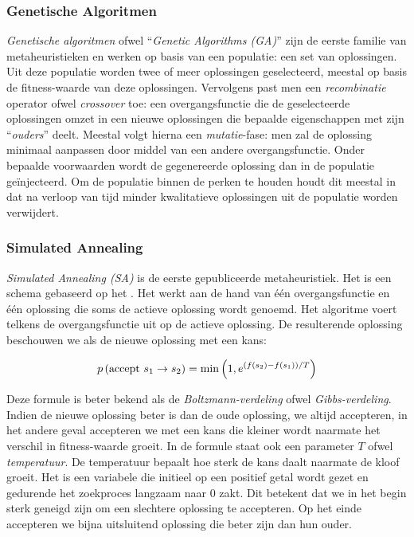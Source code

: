 \subsubsection{Genetische Algoritmen}

\emph{Genetische algoritmen} ofwel ``\emph{Genetic Algorithms (GA)}'' zijn de eerste familie van metaheuristieken en werken op basis van een populatie: een set van oplossingen. Uit deze populatie worden twee of meer oplossingen geselecteerd, meestal op basis de fitness-waarde van deze oplossingen. Vervolgens past men een \emph{recombinatie} operator ofwel \emph{crossover} toe: een overgangsfunctie die de geselecteerde oplossingen omzet in een nieuwe oplossingen die bepaalde eigenschappen met zijn ``\emph{ouders}'' deelt. Meestal volgt hierna een \emph{mutatie}-fase: men zal de oplossing minimaal aanpassen door middel van een andere overgangsfunctie. Onder bepaalde voorwaarden wordt de gegenereerde oplossing dan in de populatie ge\"injecteerd. Om de populatie binnen de perken te houden houdt dit meestal in dat na verloop van tijd minder kwalitatieve oplossingen uit de populatie worden verwijdert.\cite{holland1992adaption-in-nat,goldberg89,melanie_mitchell_book}

\subsubsection{Simulated Annealing}

\emph{Simulated Annealing (SA)} is de eerste gepubliceerde metaheuristiek. Het is een schema gebaseerd op het \cite{Metropolis1953}. Het werkt aan de hand van \'e\'en overgangsfunctie en \'e\'en oplossing die soms de actieve oplossing wordt genoemd. Het algoritme voert telkens de overgangsfunctie uit op de actieve oplossing. De resulterende oplossing beschouwen we als de nieuwe oplossing met een kans:

\begin{equation}
p\left(\mbox{accept $s_1\rightarrow s_2$}\right)=\min\left(1,e^{\left(f\left(s_2\right)-f\left(s_1\right)\right)/T}\right)
\end{equation}

Deze formule is beter bekend als de \emph{Boltzmann-verdeling} ofwel \emph{Gibbs-verdeling}\cite{gibbs1902elementary}. Indien de nieuwe oplossing beter is dan de oude oplossing, we altijd accepteren, in het andere geval accepteren we met een kans die kleiner wordt naarmate het verschil in fitness-waarde groeit. In de formule staat ook een parameter $T$ ofwel \emph{temperatuur}. De temperatuur bepaalt hoe sterk de kans daalt naarmate de kloof groeit. Het is een variabele die initieel op een positief getal wordt gezet en gedurende het zoekproces langzaam naar $0$ zakt. Dit betekent dat we in het begin sterk geneigd zijn om een slechtere oplossing te accepteren. Op het einde accepteren we bijna uitsluitend oplossing die beter zijn dan hun ouder.\cite{citeulike:1612433,Cerny1985Thermodynamical}

